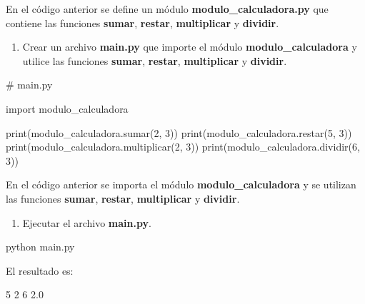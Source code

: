 \documentclass[
  a4paper,
  DIV=11,
  numbers=noendperiod,
  onepage,
  openany]{scrreprt}
\newenvironment{Shaded}{\begin{snugshade}}{\end{snugshade}}
\newcommand{\BuiltInTok}[1]{\textcolor[rgb]{0.00,0.23,0.31}{#1}}
\newcommand{\CommentTok}[1]{\textcolor[rgb]{0.37,0.37,0.37}{#1}}
\newcommand{\DecValTok}[1]{\textcolor[rgb]{0.68,0.00,0.00}{#1}}
\newcommand{\ExtensionTok}[1]{\textcolor[rgb]{0.00,0.23,0.31}{#1}}
\newcommand{\ImportTok}[1]{\textcolor[rgb]{0.00,0.46,0.62}{#1}}
\newcommand{\NormalTok}[1]{\textcolor[rgb]{0.00,0.23,0.31}{#1}}
\providecommand{\tightlist}{%
  \setlength{\itemsep}{0pt}\setlength{\parskip}{0pt}}\usepackage{longtable,booktabs,array}
\begin{document}
En el código anterior se define un módulo
\textbf{modulo\_calculadora.py} que contiene las funciones
\textbf{sumar}, \textbf{restar}, \textbf{multiplicar} y
\textbf{dividir}.

\begin{enumerate}
\def\labelenumi{\arabic{enumi}.}
\setcounter{enumi}{1}
\tightlist
\item
  Crear un archivo \textbf{main.py} que importe el módulo
  \textbf{modulo\_calculadora} y utilice las funciones \textbf{sumar},
  \textbf{restar}, \textbf{multiplicar} y \textbf{dividir}.
\end{enumerate}

\begin{Shaded}
\begin{Highlighting}[]
\CommentTok{\# main.py}

\ImportTok{import}\NormalTok{ modulo\_calculadora}

\BuiltInTok{print}\NormalTok{(modulo\_calculadora.sumar(}\DecValTok{2}\NormalTok{, }\DecValTok{3}\NormalTok{))}
\BuiltInTok{print}\NormalTok{(modulo\_calculadora.restar(}\DecValTok{5}\NormalTok{, }\DecValTok{3}\NormalTok{))}
\BuiltInTok{print}\NormalTok{(modulo\_calculadora.multiplicar(}\DecValTok{2}\NormalTok{, }\DecValTok{3}\NormalTok{))}
\BuiltInTok{print}\NormalTok{(modulo\_calculadora.dividir(}\DecValTok{6}\NormalTok{, }\DecValTok{3}\NormalTok{))}
\end{Highlighting}
\end{Shaded}

En el código anterior se importa el módulo \textbf{modulo\_calculadora}
y se utilizan las funciones \textbf{sumar}, \textbf{restar},
\textbf{multiplicar} y \textbf{dividir}.

\begin{enumerate}
\def\labelenumi{\arabic{enumi}.}
\setcounter{enumi}{2}
\tightlist
\item
  Ejecutar el archivo \textbf{main.py}.
\end{enumerate}

\begin{Shaded}
\begin{Highlighting}[]
\ExtensionTok{python}\NormalTok{ main.py}
\end{Highlighting}
\end{Shaded}

El resultado es:

\begin{Shaded}
\begin{Highlighting}[]
\ExtensionTok{5}
\ExtensionTok{2}
\ExtensionTok{6}
\ExtensionTok{2.0}
\end{Highlighting}
\end{Shaded}
\end{document}
